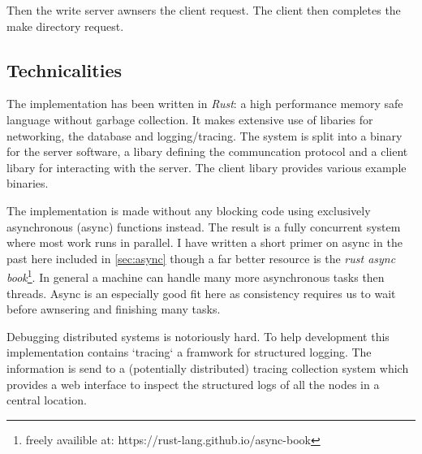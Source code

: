 Then the write server awnsers the client request. The client then completes the make directory request.

\subsection{Technicalities}
The implementation has been written in \textit{Rust}: a high performance memory safe language without garbage collection. It makes extensive use of libaries for networking, the database and logging/tracing. The system is split into a binary for the server software, a libary defining the communcation protocol and a client libary for interacting with the server. The client libary provides various example binaries.

The implementation is made without any blocking code using exclusively asynchronous (async) functions instead. The result is a fully concurrent system where most work runs in parallel. I have written a short primer on async in the past here included in \cref{sec:async} though a far better resource is the \textit{rust async book}\footnote{freely availible at: https://rust-lang.github.io/async-book}. In general a machine can handle many more asynchronous tasks then threads. Async is an especially good fit here as consistency requires us to wait before awnsering and finishing many tasks.

Debugging distributed systems is notoriously hard. To help development this implementation contains `tracing` a framwork for structured logging. The information is send to a (potentially distributed) tracing collection system which provides a web interface to inspect the structured logs of all the nodes in a central location.
